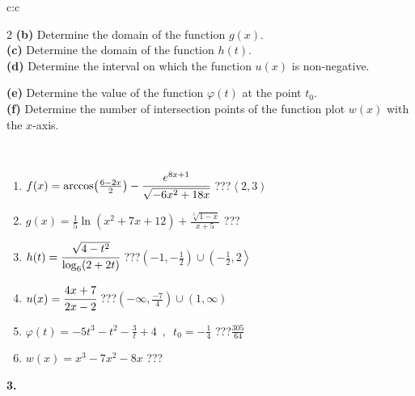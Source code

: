 \documentclass[10pt]{report}
\begin{document}
\begin{tabular}{c:c}
\begin{minipage}[c][104.5mm][t]{0.5\linewidth}
\begin{center}
\begin{minipage}{0.95\linewidth}
\begin{center}
{\begin{multicols}{2}
\textbf{(b)} Determine the domain of the function \(g(x)\). \\[1mm]
\textbf{(c)} Determine the domain of the function \(h(t)\). \\[1mm]
\textbf{(d)} Determine the interval on which the function \(u(x)\) is non-negative. \par \columnbreak
\textbf{(e)} Determine the value of the function \(\varphi(t)\) at the point \(t_0\). \\[1mm]
\textbf{(f)} Determine the number of intersection points of the function plot \(w(x)\) with the \(x\)-axis. \\[1mm]
\end{multicols}
}
\end{center}
\end{minipage}
\\[4mm]
\begin{minipage}{0.79\linewidth}
\begin{center}
\begin{varwidth}{\linewidth}
\begin{enumerate}
\small
\item $f(x) = \arccos\!\left( \frac{6-2x}{2} \right) - \cfrac{e^{8x+1}}{\sqrt{-6x^2+18x}}$\quad \dotfill\; ???\;\dotfill \quad $\left\langle2 , 3\right)$
\item $g(x) = \frac{1}{5} \ln{\!(x^2+7x+12)}+\frac{\sqrt[3]{1-x}}{x+5}$\quad \dotfill\; ???\;\dotfill {}
\item $h(t) = \cfrac{\sqrt{4-t^2}}{\log_6(2+2t)}$\quad \dotfill\; ???\;\dotfill \quad $\left(-1 , -\frac{1}{2}\right)\cup\left(-\frac{1}{2} , 2\right\rangle$
\item $u(x) = \cfrac{4x+7}{2x-2}$\quad \dotfill\; ???\;\dotfill \quad $\left(-\infty , \frac{-7}{4}\right)\cup\left(1 , \infty\right)$
\item $\varphi(t) = -5t^3-t^2-\frac{3}{t}+4 \enspace , \enspace t_0=-\frac{1}{4}$\quad \dotfill\; ???\;\dotfill \quad $\frac{305}{64}$
\item $w(x) = x^3-7x^2-8x$\quad \dotfill\; ???\;\dotfill {}
\end{enumerate}
\end{varwidth}
\end{center}
\end{minipage}
\begin{minipage}{0.20\linewidth}
\begin{center}
{\Huge\bfseries 3.} \\[2mm]

\end{center}
\end{minipage}
\end{center}
\end{minipage}
\end{tabular}
\end{document}
